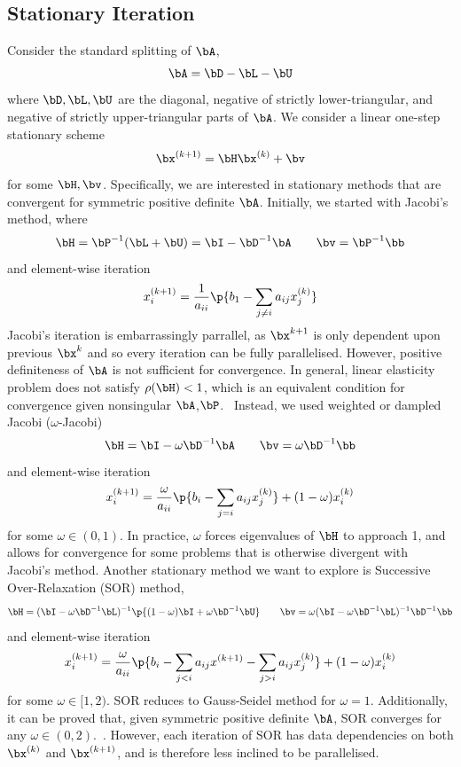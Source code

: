 \documentclass[11pt,titlepage]{article}
\begin{document}
\subsection{Stationary Iteration}

Consider the standard splitting of $\bA$,
\[
    \bA = \bD - \bL - \bU
\]
where $\bD,\bL,\bU$ are the diagonal, negative of strictly lower-triangular, and negative of strictly upper-triangular parts of $\bA$. We consider a linear one-step stationary scheme
\[
    \bx^{(k+1)} = \bH \bx^{(k)} + \bv
\]
for some $\bH,\bv$. Specifically, we are interested in stationary methods that are convergent for symmetric positive definite $\bA$. Initially, we started with Jacobi's method, where
\[
    \bH = \bP^{-1} (\bL+\bU) = \bI - \bD^{-1} \bA
    \quad\quad
    \bv = \bP^{-1}\bb
\]
and element-wise iteration
\[
    x^{(k+1)}_i = \frac{1}{a_{ii}} \p{
        b_1 - \sum_{j\neq i} a_{ij} x^{(k)}_j
    }    
\]
Jacobi's iteration is embarrassingly parrallel, as $\bx^{k+1}$ is only dependent upon previous $\bx^{k}$ and so every iteration can be fully parallelised. However, positive definiteness of $\bA$ is not sufficient for convergence. In general, linear elasticity problem does not satisfy $\rho(\bH) < 1$, which is an equivalent condition for convergence given nonsingular $\bA$,$\bP$.~\cite{iserles_2009} Instead, we used weighted or dampled Jacobi ($\omega$-Jacobi)
\[
    \bH = \bI - \omega \bD^{-1} \bA
    \quad\quad
    \bv = \omega \bD^{-1} \bb
\]
and element-wise iteration
\[
    x^{(k+1)}_{i} = \frac{\omega}{a_{ii}} \p{ b_i - \sum_{j=i} a_{ij} x_{j}^{(k)} }
        + (1-\omega) x^{(k)}_{i}
\]
for some $\omega \in (0,1)$. In practice, $\omega$ forces eigenvalues of $\bH$ to approach 1, and allows for convergence for some problems that is otherwise divergent with Jacobi's method. Another stationary method we want to explore is Successive Over-Relaxation (SOR) method,
\[
    \bH = (\bI - \omega \bD^{-1}\bL)^{-1} \p{ (1-\omega)\bI + \omega \bD^{-1}\bU }
    \quad\quad
    \bv = \omega (\bI - \omega \bD^{-1}\bL)^{-1} \bD^{-1} \bb
\]
and element-wise iteration
\[
    x_{i}^{(k+1)} = 
        \frac{\omega}{a_{ii}} \p{
            b_i - \sum_{j<i} a_{ij} x^{(k+1)}- \sum_{j>i} a_{ij} x^{(k)}_j
        }
        + 
        (1-\omega) x^{(k)}_i
\]
for some $\omega \in [1,2)$. SOR reduces to Gauss-Seidel method for $\omega=1$. Additionally, it can be proved that, given symmetric positive definite $\bA$, SOR converges for any $\omega \in (0,2)$.~\cite{saad_2003}. However, each iteration of SOR has data dependencies on both $\bx^{(k)}$ and $\bx^{(k+1)}$, and is therefore less inclined to be parallelised.
\end{document}
